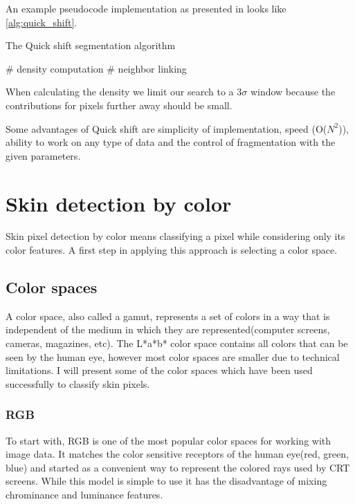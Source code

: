 \documentclass[12pt]{report}
\begin{document}
	An example pseudocode implementation as presented in \cite{quickshift_gpu} looks like \ref{alg:quick_shift}.
	\begin{algorithm}
		\caption{The Quick shift segmentation algorithm}
		\label{alg:quick_shift}
		\# density computation\;
		\# neighbor linking\;
	\end{algorithm}
	When calculating the density we limit our search to a 3$\sigma$ window because the contributions for pixels further away should be small\cite{quickshift_gpu}.
	
	Some advantages of Quick shift are simplicity of implementation, speed (O($N^2$)), ability to work on any type of data and the control of fragmentation with the given parameters\cite{mode_seeking}. 
	
	\section{Skin detection by color}
	Skin pixel detection by color means classifying a pixel while considering only its color features. A first step in applying this approach is selecting a color space.
	
	\subsection{Color spaces}
	A color space, also called a gamut, represents a set of colors in a way that is independent of the medium in which they are represented(computer screens, cameras, magazines, etc)\cite{color_management_guide}. The L*a*b* color space contains all colors that can be seen by the human eye, however most color spaces are smaller due to technical limitations. I will present some of the color spaces which have been used successfully to classify skin pixels. 
	
	\subsubsection{RGB}
	To start with, RGB is one of the most popular color spaces for working with image data. It matches the color sensitive receptors of the human eye(red, green, blue) and started as a convenient way to represent the colored rays used by CRT screens\cite{survey_color_detection_techniques}. While this model is simple to use it has the disadvantage of mixing chrominance and luminance features\cite{survey_color_detection_techniques}.
	
\end{document}
